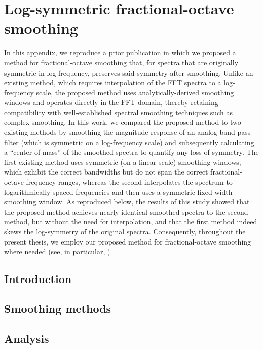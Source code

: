 \chapter{Log-symmetric fractional-octave smoothing}\label{chap:A3_Smoothing_Weights}
In this appendix, we reproduce a prior publication \citep{Tylka2017} in which we proposed a method for fractional-octave smoothing that, for spectra that are originally symmetric in log-frequency, preserves said symmetry after smoothing.
Unlike an existing method, which requires interpolation of the FFT spectra to a log-frequency scale, the proposed method uses analytically-derived smoothing windows and operates directly in the FFT domain, thereby retaining compatibility with well-established spectral smoothing techniques such as complex smoothing.
In this work, we compared the proposed method to two existing methods by smoothing the magnitude response of an analog band-pass filter (which is symmetric on a log-frequency scale) and subsequently calculating a ``center of mass'' of the smoothed spectra to quantify any loss of symmetry.
The first existing method uses symmetric (on a linear scale) smoothing windows, which exhibit the correct bandwidths but do not span the correct fractional-octave frequency ranges, whereas the second interpolates the spectrum to logarithmically-spaced frequencies and then uses a symmetric fixed-width smoothing window.
As reproduced below, the results of this study showed that the proposed method achieves nearly identical smoothed spectra to the second method, but without the need for interpolation, and that the first method indeed skews the log-symmetry of the original spectra.
Consequently, throughout the present thesis, we employ our proposed method for fractional-octave smoothing where needed (see, in particular, ).

\section{Introduction}\label{sec:A3_Smoothing_Weights:Introduction}


\section{Smoothing methods}\label{sec:A3_Smoothing_Weights:Smoothing_Methods}


\section{Analysis}\label{sec:A3_Smoothing_Weights:Analysis}


